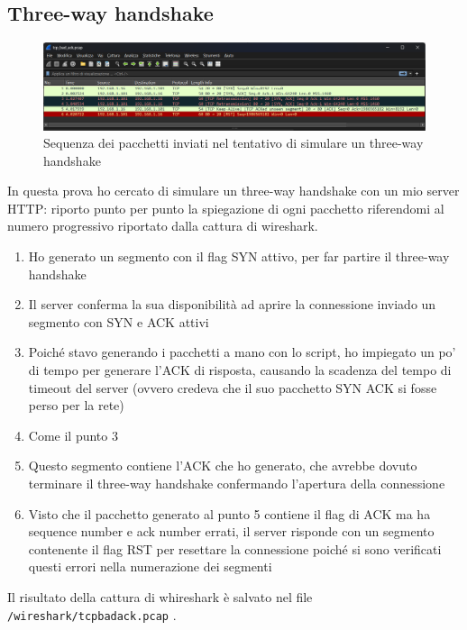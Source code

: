 \documentclass[12pt,a4paper]{report}
\begin{document}
\subsection{Three-way handshake}
\begin{figure}[H]
	\centering
	\includegraphics[width=1\textwidth]{tcp_bad_ack_packets}
 	\caption{Sequenza dei pacchetti inviati nel tentativo di simulare un three-way handshake}
	\label{tcp_bad_ack}
\end{figure}
In questa prova ho cercato di simulare un three-way handshake con un mio server HTTP: riporto punto per punto la spiegazione di ogni pacchetto riferendomi al numero progressivo riportato dalla cattura di wireshark.
\begin{enumerate}
	\item Ho generato un segmento con il flag SYN attivo, per far partire il three-way handshake
	\item Il server conferma la sua disponibilità ad aprire la connessione inviado un segmento con SYN e ACK attivi
	\item Poiché stavo generando i pacchetti a mano con lo script, ho impiegato un po' di tempo per generare l'ACK di risposta, causando la scadenza del tempo di timeout del server (ovvero credeva che il suo pacchetto SYN ACK si fosse perso per la rete)
	\item Come il punto 3
	\item Questo segmento contiene l'ACK che ho generato, che avrebbe dovuto terminare il three-way handshake confermando l'apertura della connessione
	\item Visto che il pacchetto generato al punto 5 contiene il flag di ACK ma ha sequence number e ack number errati, il server risponde con un segmento contenente il flag RST per resettare la connessione poiché si sono verificati questi errori nella numerazione dei segmenti
\end{enumerate}
Il risultato della cattura di whireshark è salvato nel file \texttt{/wireshark/tcp{\textunderscore}bad{\textunderscore}ack.pcap} .
\end{document}
